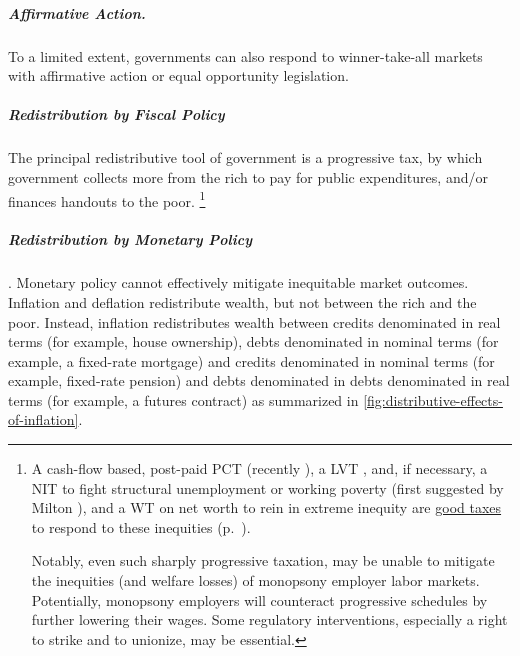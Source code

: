 \subparagraph{Affirmative Action.}  \label{sec:affirmative-action} To a limited extent, governments can also respond to winner-take-all markets with affirmative action or equal opportunity legislation.

\subparagraph{Redistribution by Fiscal Policy}  \label{sec:fiscal-redistribution} The principal redistributive tool of government is a progressive tax, by which government collects more from the rich to pay for public expenditures, and/or finances handouts to the poor.
\footnote{
	A cash-flow based, post-paid \gls{PCT} (recently \citealt{McCaffery2002,McCaffery2005}), a \gls{LVT} \citep{George1879}, and, if necessary, a \gls{NIT} to fight structural unemployment or working poverty (first suggested by Milton \citealt{Friedman1962}), and a \gls{WT} on net worth to rein in extreme inequity are \hyperref[chap:better-tax]{good taxes} to respond to these inequities (p.~\pageref{chap:better-tax}).

	Notably, even such sharply progressive taxation, may be unable to mitigate the inequities (and welfare losses) of monopsony employer labor markets.
	Potentially, monopsony employers will counteract progressive schedules by further lowering their wages.
	Some regulatory interventions, especially a right to strike and to unionize, may be essential.
}




\subparagraph{Redistribution by Monetary Policy}  \label{sec:distributive-effects-of-inflation}.
 Monetary policy cannot effectively mitigate inequitable market outcomes.
Inflation and deflation redistribute wealth, but not between the rich and the poor.
Instead, inflation redistributes wealth between credits denominated in real terms (for example, house ownership), debts denominated in nominal terms (for example, a fixed-rate mortgage) and credits denominated in nominal terms (for example, fixed-rate pension) and debts denominated in debts denominated in real terms (for example, a futures contract) as summarized in \autoref{fig:distributive-effects-of-inflation}.

